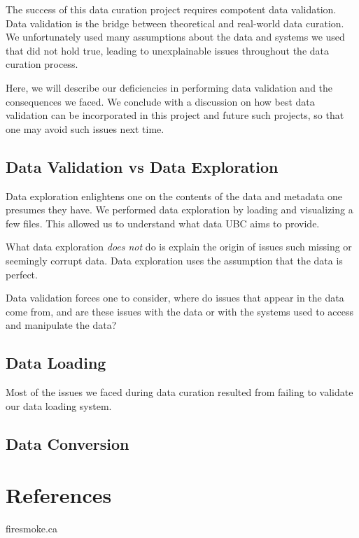 \documentclass[
  letterpaper,
  DIV=11,
  numbers=noendperiod]{scrreprt}
\newlength{\cslhangindent}
\newenvironment{CSLReferences}[2] %
 {\begin{list}{}{%
  \setlength{\itemindent}{0pt}
  \setlength{\leftmargin}{0pt}
  \setlength{\parsep}{0pt}
  \ifodd #1
   \setlength{\leftmargin}{\cslhangindent}
   \setlength{\itemindent}{-1\cslhangindent}
  \fi
  \setlength{\itemsep}{#2\baselineskip}}}
 {\end{list}}
\begin{document}
The success of this data curation project requires compotent data
validation. Data validation is the bridge between theoretical and
real-world data curation. We unfortunately used many assumptions about
the data and systems we used that did not hold true, leading to
unexplainable issues throughout the data curation process.

Here, we will describe our deficiencies in performing data validation
and the consequences we faced. We conclude with a discussion on how best
data validation can be incorporated in this project and future such
projects, so that one may avoid such issues next time.

\section{Data Validation vs Data
Exploration}\label{data-validation-vs-data-exploration}

Data exploration enlightens one on the contents of the data and metadata
one presumes they have. We performed data exploration by loading and
visualizing a few files. This allowed us to understand what data UBC
aims to provide.

What data exploration \emph{does not} do is explain the origin of issues
such missing or seemingly corrupt data. Data exploration uses the
assumption that the data is perfect.

Data validation forces one to consider, where do issues that appear in
the data come from, and are these issues with the data or with the
systems used to access and manipulate the data?

\section{Data Loading}\label{data-loading}

Most of the issues we faced during data curation resulted from failing
to validate our data loading system.

\section{Data Conversion}\label{data-conversion}


\chapter*{References}\label{references-2}


\label{refs}
\begin{CSLReferences}{0}{1}
firesmoke.ca

\end{CSLReferences}
\end{document}
